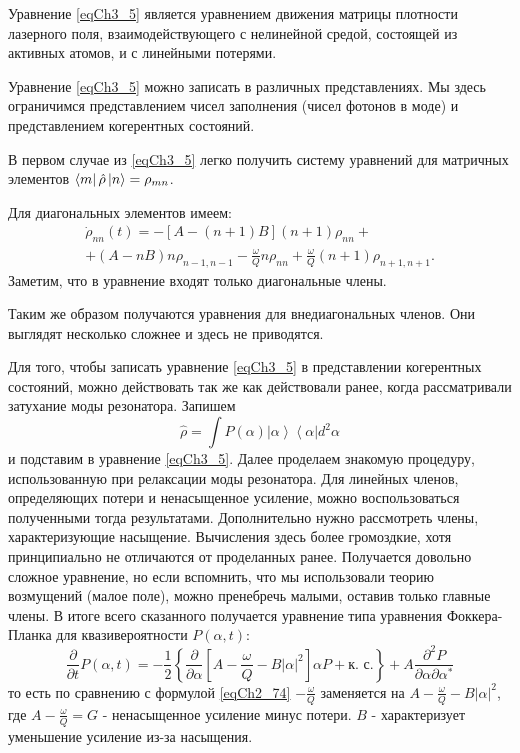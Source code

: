Уравнение \eqref{eqCh3_5} является уравнением движения матрицы
плотности лазерного поля, взаимодействующего с нелинейной средой,
состоящей из активных атомов, и с линейными потерями. 

Уравнение \eqref{eqCh3_5} можно записать в различных
представлениях. Мы здесь ограничимся представлением чисел заполнения
(чисел фотонов в моде) и представлением когерентных состояний. 

В первом случае из \eqref{eqCh3_5} легко получить систему уравнений
для матричных элементов $\bra{m}\hat{\rho}\ket{n} =
\rho_{mn}$.  

Для диагональных элементов имеем:
\begin{eqnarray}
\dot{\rho}_{nn}\left(t\right) = 
-\left[A - \left(n + 1\right)B\right]\left(n + 1\right)\rho_{nn} +
\nonumber \\
+ \left(A - n B\right)n \rho_{n - 1, n - 1} 
- \frac{\omega}{Q}n \rho_{nn} + 
\frac{\omega}{Q} \left(n + 1\right)\rho_{n + 1, n + 1}.
\label{eqCh3_6}
\end{eqnarray}
Заметим, что в уравнение входят только диагональные члены. 

Таким же образом получаются уравнения для внедиагональных членов. Они
выглядят несколько сложнее и здесь не приводятся. 

Для того, чтобы записать уравнение \eqref{eqCh3_5} в представлении
когерентных состояний, можно действовать так же как действовали ранее,
когда рассматривали затухание моды резонатора. Запишем 
\[
\hat{\rho} = \int
P\left(\alpha\right)\left|\alpha\right>\left<\alpha\right| d^2 \alpha 
\]
и подставим в уравнение \eqref{eqCh3_5}. Далее проделаем знакомую
процедуру, использованную при релаксации моды резонатора. Для линейных
членов, определяющих потери и ненасыщенное усиление, можно
воспользоваться полученными тогда результатами. Дополнительно нужно
рассмотреть члены, характеризующие насыщение. Вычисления здесь более
громоздкие, хотя принципиально не отличаются от проделанных
ранее. Получается довольно сложное уравнение, но если вспомнить, что
мы использовали теорию возмущений (малое поле), можно пренебречь
малыми, оставив только главные члены\cite{bMandel2000}. 
В итоге всего сказанного получается
уравнение типа уравнения Фоккера-Планка для квазивероятности
$P\left(\alpha, t\right)$:  
\begin{equation}
\frac{\partial}{\partial t} P\left(\alpha, t\right) = 
- \frac{1}{2}\left\{ 
\frac{\partial}{\partial \alpha}
\left[
A - \frac{\omega}{Q} - B \left|\alpha\right|^2
\right] \alpha P + \mbox{к. с.}
\right\} + 
A \frac{\partial^2 P}{\partial \alpha \partial \alpha^{*}}
\label{eqCh3_7}
\end{equation}
то есть по сравнению с формулой \eqref{eqCh2_74} $-\frac{\omega}{Q}$
заменяется на $A - \frac{\omega}{Q} - B\left|\alpha\right|^2$,  где $A
- \frac{\omega}{Q} = G$ - ненасыщенное усиление минус потери. $B$ - 
характеризует уменьшение усиление из-за насыщения. 
